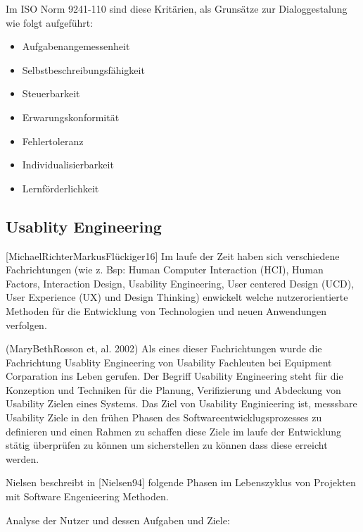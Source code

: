 Im ISO Norm  9241-110 sind diese Kritärien, als Grunsätze zur Dialoggestalung wie folgt aufgeführt: %

\begin{itemize}
	\item Aufgabenangemessenheit
	\item Selbstbeschreibungsfähigkeit
	\item Steuerbarkeit
	\item Erwarungskonformität
	\item Fehlertoleranz
	\item Individualisierbarkeit
	\item Lernförderlichkeit
\end{itemize}



\subsection{Usablity Engineering}

[MichaelRichterMarkusFlückiger16]  Im laufe der Zeit haben sich verschiedene Fachrichtungen (wie z. Bsp: Human Computer Interaction (HCI), Human Factors, Interaction Design, Usability Engineering, 
User centered Design (UCD), User Experience (UX) und Design Thinking)  enwickelt welche nutzerorientierte Methoden für die Entwicklung von Technologien und neuen Anwendungen verfolgen. 

(MaryBethRosson et, al. 2002) Als eines dieser Fachrichtungen wurde die Fachrichtung Usablity Engineering von Usability Fachleuten bei Equipment Corparation ins Leben gerufen.  
Der Begriff Usability Engineering steht für die Konzeption und Techniken für die Planung, Verifizierung und Abdeckung von Usability Zielen eines Systems. Das Ziel von Usability Enginieering ist, 
messsbare Usability Ziele in den frühen Phasen des Softwareentwicklugsprozesses zu definieren und einen Rahmen zu schaffen diese Ziele im laufe der Entwicklung stätig überprüfen zu können 
um sicherstellen zu können dass diese erreicht werden.

Nielsen beschreibt in [Nielsen94] folgende Phasen im Lebenszyklus von Projekten mit Software Engenieering Methoden.

Analyse der Nutzer und dessen Aufgaben und Ziele:  

